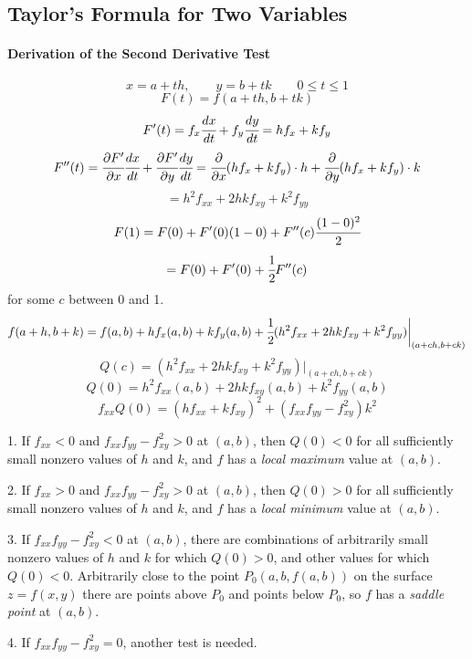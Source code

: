 \documentclass{article}
\begin{document}
        \subsection{Taylor's Formula for Two Variables}
            \paragraph{Derivation of the Second Derivative Test}
                \[x=a+th,\qquad y=b+tk\qquad 0\le t\le 1\]
                \[F(t)=f(a+th,b+tk)\]
                \[F'(t)=f_x\cfrac{dx}{dt}+f_y\cfrac{dy}{dt}=hf_x+kf_y\]
                \[F''(t)=\cfrac{\partial F'}{\partial x}\cfrac{dx}{dt}+\cfrac{\partial F'}{\partial y}\cfrac{dy}{dt}=\cfrac{\partial}{\partial x}(hf_x+kf_y)\cdot h+\cfrac{\partial}{\partial y}(hf_x+kf_y)\cdot k\]
                \[=h^2f_{xx}+2hkf_{xy}+k^2f_{yy}\]
                \[F(1)=F(0)+F'(0)(1-0)+F''(c)\cfrac{(1-0)^2}{2}\]
                \[=F(0)+F'(0)+\cfrac{1}{2}F''(c)\]
                for some $c$ between 0 and 1.
                \[f(a+h,b+k)=f(a,b)+hf_x(a,b)+kf_y(a,b)+\cfrac{1}{2}(h^2f_{xx}+2hkf_{xy}+k^2f_{yy})\bigg|_{(a+ch,b+ck)}\]
                \[Q(c)=(h^2f_{xx}+2hkf_{xy}+k^2f_{yy})\bigg|_{(a+ch,b+ck)}\]
                \[Q(0)=h^2f_{xx}(a,b)+2hkf_{xy}(a,b)+k^2f_{yy}(a,b)\]
                \[f_{xx}Q(0)=(hf_{xx}+kf_{xy})^2+(f_{xx}f_{yy}-f_{xy}^2)k^2\]
                \par 1. If $f_{xx}<0$ and $f_{xx}f_{yy}-f_{xy}^2>0$ at $(a,b)$, then $Q(0)<0$ for all sufficiently small nonzero values of $h$ and $k$, and $f$ has a \textit{local maximum} value at $(a,b)$.
                \par 2. If $f_{xx}>0$ and $f_{xx}f_{yy}-f_{xy}^2>0$ at $(a,b)$, then $Q(0)>0$ for all sufficiently small nonzero values of $h$ and $k$, and $f$ has a \textit{local minimum} value at $(a,b)$.
                \par 3. If $f_{xx}f_{yy}-f_{xy}^2<0$ at $(a,b)$, there are combinations of arbitrarily small nonzero values of $h$ and $k$ for which $Q(0)>0$, and other values for which $Q(0)<0$. Arbitrarily close to the point $P_0(a,b,f(a,b))$ on the surface $z=f(x,y)$ there are points above $P_0$ and points below $P_0$, so $f$ has a \textit{saddle point} at $(a,b)$.
                \par 4. If $f_{xx}f_{yy}-f_{xy}^2=0$, another test is needed.
\end{document}
